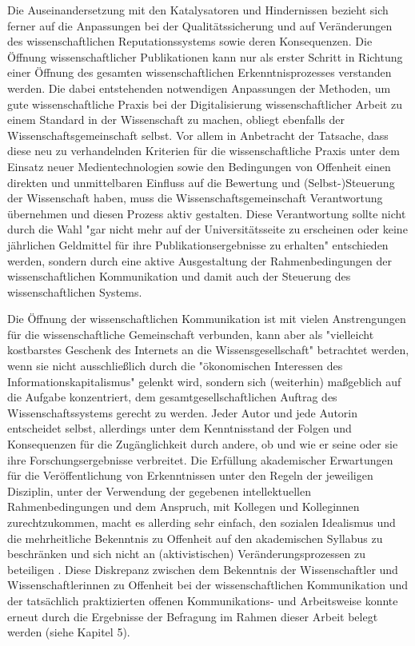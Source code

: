 Die Auseinandersetzung mit den Katalysatoren und Hindernissen bezieht sich ferner auf die Anpassungen bei der Qualitätssicherung und auf Veränderungen des wissenschaftlichen Reputationssystems sowie deren Konsequenzen. Die Öffnung wissenschaftlicher Publikationen kann nur als erster Schritt in Richtung einer Öffnung des gesamten wissenschaftlichen Erkenntnisprozesses verstanden werden. Die dabei entstehenden notwendigen Anpassungen der Methoden, um gute wissenschaftliche Praxis bei der Digitalisierung wissenschaftlicher Arbeit zu einem Standard in der Wissenschaft zu machen, obliegt ebenfalls der Wissenschaftsgemeinschaft selbst. Vor allem in Anbetracht der Tatsache, dass diese neu zu verhandelnden Kriterien für die wissenschaftliche Praxis unter dem Einsatz neuer Medientechnologien sowie den Bedingungen von Offenheit einen direkten und unmittelbaren Einfluss auf die Bewertung und (Selbst-)Steuerung der Wissenschaft haben, muss die Wissenschaftsgemeinschaft Verantwortung übernehmen und diesen Prozess aktiv gestalten. Diese Verantwortung sollte nicht durch die Wahl "gar nicht mehr auf der Universitätsseite zu erscheinen oder keine jährlichen Geldmittel für ihre Publikationsergebnisse zu erhalten" \cite{Warnke_2012} entschieden werden, sondern durch eine aktive Ausgestaltung der Rahmenbedingungen der wissenschaftlichen Kommunikation und damit auch der Steuerung des wissenschaftlichen Systems.

Die Öffnung der wissenschaftlichen Kommunikation ist mit vielen Anstrengungen für die wissenschaftliche Gemeinschaft verbunden, kann aber als "vielleicht kostbarstes Geschenk des Internets an die Wissensgesellschaft" betrachtet werden, wenn sie nicht ausschließlich durch die "ökonomischen Interessen des Informationskapitalismus" \cite[:65]{Hagner_2015} gelenkt wird, sondern sich (weiterhin) maßgeblich auf die Aufgabe konzentriert, dem gesamtgesellschaftlichen Auftrag des Wissenschaftssystems gerecht zu werden. Jeder Autor und jede Autorin entscheidet selbst, allerdings unter dem Kenntnisstand der Folgen und Konsequenzen für die Zugänglichkeit durch andere, ob und wie er seine oder sie ihre Forschungsergebnisse verbreitet. Die Erfüllung akademischer Erwartungen für die Veröffentlichung von Erkenntnissen unter den Regeln der jeweiligen Disziplin, unter der Verwendung der gegebenen intellektuellen Rahmenbedingungen und dem Anspruch, mit Kollegen und Kolleginnen zurechtzukommen, macht es allerding sehr einfach, den sozialen Idealismus und die mehrheitliche Bekenntnis zu Offenheit \cite[:66]{Hagner_2015} auf den akademischen Syllabus zu beschränken und sich nicht an (aktivistischen) Veränderungsprozessen zu beteiligen \cite[:25]{Flood_2013}. Diese Diskrepanz zwischen dem Bekenntnis der Wissenschaftler und Wissenschaftlerinnen zu Offenheit bei der wissenschaftlichen Kommunikation und der tatsächlich praktizierten offenen Kommunikations- und Arbeitsweise konnte erneut durch die Ergebnisse der Befragung im Rahmen dieser Arbeit belegt werden (siehe Kapitel 5).

